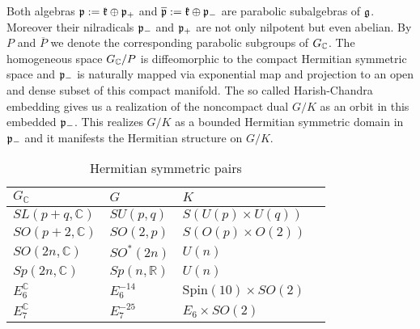 Both algebras $\mathfrak{p} := \mathfrak{k}\oplus \mathfrak{p}_+$ and $\overline{\mathfrak{p}} := \mathfrak{k}\oplus\mathfrak{p}_-$ are parabolic subalgebras of $\mathfrak{g}$. Moreover their nilradicals $\mathfrak{p}_-$ and $\mathfrak{p}_+$ are not only nilpotent but even abelian. By $P$ and $\overline{P}$ we denote the corresponding parabolic subgroups of $G_{\mathbb{C}}$. The homogeneous space $G_{\mathbb{C}}/P$ is diffeomorphic to the compact Hermitian symmetric space and $\mathfrak{p}_-$ is naturally mapped via exponential map and projection to an open and dense subset of this compact manifold. The so called Harish-Chandra embedding gives us a realization of the noncompact dual $G/K$ as an orbit in this embedded $\mathfrak{p}_-$. This realizes $G/K$ as a bounded Hermitian symmetric domain in $\mathfrak{p}_-$ and it manifests the Hermitian structure on $G/K$.

\begin{table}[H]\label{fig:herm_pairs}
\begin{center}%
\begin{tabular}{llll}
$G_\mathbb{C}$ & {\centering $G$ }&  $K$\\\hline
$SL(p+q,\mathbb{C})$ & $SU(p,q)$ &$S(U(p)\times U(q))$\\
$SO(p+2,\mathbb{C})$ &  $SO(2,p)$ & $S(O(p)\times O(2))$\\
$SO(2n,\mathbb{C})$ &   $SO^*(2n)$ & $U(n)$\\
$Sp(2n,\mathbb{C})$ &   $Sp(n,\mathbb{R})$ & $U(n)$\\
$E_6^\mathbb{C}$ &   $E_6^{-14}$& $\mathrm{Spin}(10)\times SO(2)$\\
$E_7^\mathbb{C}$ &  $E_7^{-25} $ & $E_6\times SO(2)$
\end{tabular}\caption{Hermitian symmetric pairs}
\end{center}
\end{table}

